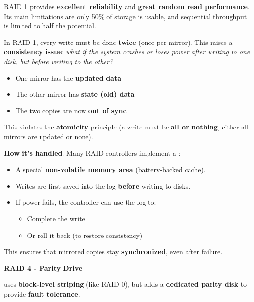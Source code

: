 RAID 1 provides \textbf{excellent reliability} and \textbf{great random read performance}. Its main limitations are only 50\% of storage is usable, and sequential throughput is limited to half the potential.

\highspace
\begin{flushleft}
\end{flushleft}
In RAID 1, every write must be done \textbf{twice} (once per mirror). This raises a \textbf{consistency issue}: \emph{what if the system crashes or loses power after writing to one disk, but before writing to the other?}
\begin{itemize}
    \item One mirror has the \textbf{updated data}
    \item The other mirror has \textbf{state (old) data}
    \item The two copies are now \textbf{out of sync}
\end{itemize}
This violates the \textbf{atomicity} principle (a write must be \textbf{all or nothing}, either all mirrors are updated or none).

\highspace
\textcolor{Green3}{ \textbf{How it's handled}}. Many RAID controllers implement a :
\begin{itemize}
    \item A special \textbf{non-volatile memory area} (battery-backed cache).
    \item Writes are first saved into the log \textbf{before} writing to disks.
    \item If power fails, the controller can use the log to:
    \begin{itemize}
        \item Complete the write
        \item Or roll it back (to restore consistency)
    \end{itemize}
\end{itemize}
This ensures that mirrored copies stay \textbf{synchronized}, even after failure.

\newpage

\begin{center}\label{RAID 4}
    \large
    \hypertarget{RAID 4}{\textcolor{Red2}{\textbf{RAID 4 - Parity Drive}}}
\end{center}
 uses \textbf{block-level striping} (like RAID 0), but adds a \textbf{dedicated parity disk} to provide \textbf{fault tolerance}.

